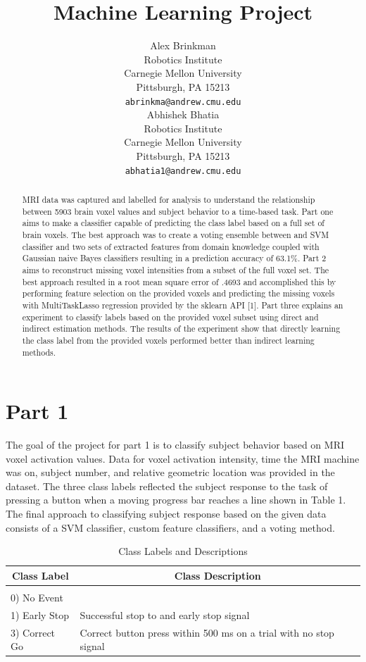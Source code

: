 \documentclass{article} %
\title{Machine Learning Project}
\author{
Alex Brinkman\\
Robotics Institute\\
Carnegie Mellon University\\
Pittsburgh, PA 15213 \\
\texttt{abrinkma@andrew.cmu.edu} \\
\And
Abhishek Bhatia \\
Robotics Institute \\
Carnegie Mellon University\\
Pittsburgh, PA 15213 \\
\texttt{abhatia1@andrew.cmu.edu} \\
}
\begin{document}
\maketitle

\begin{abstract}
MRI data was captured and labelled for analysis to understand the relationship between 5903 brain voxel values and subject behavior to a time-based task. Part one aims to make a classifier capable of predicting the class label based on a full set of brain voxels. The best approach was to create a voting ensemble between and SVM classifier and two sets of extracted features from domain knowledge coupled with Gaussian naive Bayes classifiers resulting in a prediction accuracy of 63.1\%. Part 2 aims to reconstruct missing voxel intensities from a subset of the full voxel set. The best approach resulted in a root mean square error of .4693 and accomplished this by performing feature selection on the provided voxels and predicting the missing voxels with MultiTaskLasso regression provided by the sklearn API [1]. Part three explains an experiment to classify labels based on the provided voxel subset using direct and indirect estimation methods. The results of the experiment show that directly learning the class label from the provided voxels performed better than indirect learning methods.

\end{abstract}

\section{Part 1}
The goal of the project for part 1 is to classify subject behavior based on MRI voxel activation values. Data for voxel activation intensity, time the MRI machine was on, subject number, and relative geometric location was provided in the dataset. The three class labels reflected the subject response to the task of pressing a button when a moving progress bar reaches a line shown in Table 1. The final approach to classifying subject response based on the given data consists of a SVM classifier, custom feature classifiers, and a voting method. 

\begin{table}[h]
\caption{Class Labels and Descriptions}
\label{classtable}
\begin{center}
	\begin{tabular}{ll}
		\multicolumn{1}{c}{\bf Class Label}  &\multicolumn{1}{c}{\bf Class Description}
		\\ \hline \\
		0) No Event   &       \\
		1) Early Stop   &Successful stop to and early stop signal \\
		3) Correct Go		&Correct button press within 500 ms on a trial with no stop signal\\
	\end{tabular}
\end{center}
\end{table}  
\end{document}
